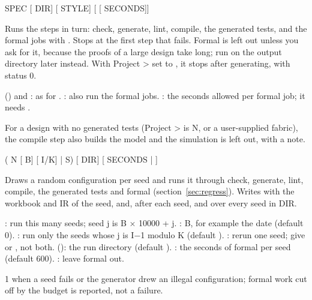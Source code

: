 \begin{entry}{ SPEC [ DIR] [ STYLE] [ [ SECONDS]]}
\item[Does] Runs the steps in turn: check, generate, lint, compile, the generated tests,
  and the formal jobs with . Stops at the first step that fails. Formal is
  left out unless you ask for it, because the proofs of a large design take long; run
   on the output directory later instead. With Project >
   set to , it stops after generating, with status 0.
\item[Options]  () and : as for .
  : also run the formal jobs. : the seconds allowed
  per formal job; it needs .
\item[Without tests] For a design with no generated tests (Project >
   is N, or a user-supplied fabric), the compile
  step also builds the model and the simulation is left out, with a note.
\end{entry}

\begin{entry}{ ( N [ B] [ I/K] |  S) [ DIR] [ SECONDS | ]}
\item[Does] Draws a random configuration per seed and runs it through check, generate,
  lint, compile, the generated tests and formal (section~\ref{sec:regress}). Writes
   with the workbook and IR of the seed, and, after each
  seed,  and  over every seed in DIR.
\item[Options] : run this many seeds; seed j is B $\times$ 10000 + j.
  : B, for example the date (default 0). : run only the
  seeds whose j is I$-$1 modulo K (default ). : rerun one seed;
  give  or , not both.  (): the run
  directory (default ). : the seconds of formal
  per seed (default 600). : leave formal out.
\item[Exit status] 1 when a seed fails or the generator drew an illegal configuration;
  formal work cut off by the budget is reported, not a failure.
\end{entry}

